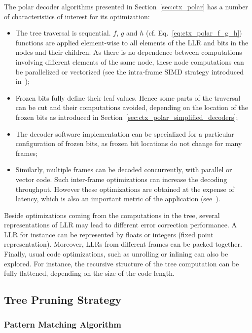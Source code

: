 The polar decoder algorithms presented in Section~\ref{sec:ctx_polar} has a
number of characteristics of interest for its optimization:
\begin{itemize}
  \item The tree traversal is sequential. $f$, $g$ and $h$ (cf.
    Eq.~\ref{eq:ctx_polar_f_g_h}) functions are applied element-wise to all
    elements of the LLR and bits in the nodes and their children. As there is no
    dependence between computations involving different elements of the same
    node, these node computations can be parallelized or vectorized (see the
    intra-frame SIMD strategy introduced in~\cite{Giard2014});
  \item Frozen bits fully define their leaf values. Hence some parts of the
    traversal can be cut and their computations avoided, depending on the
    location of the frozen bits as introduced in
    Section~\ref{sec:ctx_polar_simplified_decoders};
  \item The decoder software implementation can be specialized for a particular
    configuration of frozen bits, as frozen bit locations do not change for many
    frames;
  \item Similarly, multiple frames can be decoded concurrently, with parallel or
    vector code. Such inter-frame optimizations can increase the decoding
    throughput. However these optimizations are obtained at the expense of
    latency, which is also an important metric of the application
    (see~\cite{LeGal2015a}).
\end{itemize}

Beside optimizations coming from the computations in the tree, several
representations of LLR may lead to different error correction performance. A LLR
for instance can be represented by floats or integers (fixed point
representation). Moreover, LLRs from different frames can be packed together.
Finally, usual code optimizations, such as unrolling or inlining can also be
explored. For instance, the recursive structure of the tree computation can be
fully flattened, depending on the size of the code length.

\subsection{Tree Pruning Strategy}
\label{sec:opt_polar_tree_pruning}

\subsubsection{Pattern Matching Algorithm}
\label{sec:opt_polar_pattern_matching}

